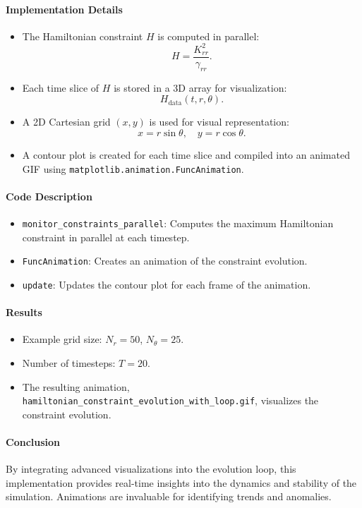 \documentclass[12pt]{article}
\begin{document}
\paragraph{Implementation Details}
\begin{itemize}
    \item The Hamiltonian constraint $H$ is computed in parallel:
    \[
    H = \frac{K_{rr}^2}{\gamma_{rr}}.
    \]
    \item Each time slice of $H$ is stored in a 3D array for visualization:
    \[
    H_{\text{data}}(t, r, \theta).
    \]
    \item A 2D Cartesian grid $(x, y)$ is used for visual representation:
    \[
    x = r \sin\theta, \quad y = r \cos\theta.
    \]
    \item A contour plot is created for each time slice and compiled into an animated GIF using \texttt{matplotlib.animation.FuncAnimation}.
\end{itemize}

\paragraph{Code Description}
\begin{itemize}
    \item \texttt{monitor\_constraints\_parallel}: Computes the maximum Hamiltonian constraint in parallel at each timestep.
    \item \texttt{FuncAnimation}: Creates an animation of the constraint evolution.
    \item \texttt{update}: Updates the contour plot for each frame of the animation.
\end{itemize}

\paragraph{Results}
\begin{itemize}
    \item Example grid size: $N_r = 50$, $N_\theta = 25$.
    \item Number of timesteps: $T = 20$.
    \item The resulting animation, \texttt{hamiltonian\_constraint\_evolution\_with\_loop.gif}, visualizes the constraint evolution.
\end{itemize}

\paragraph{Conclusion}
By integrating advanced visualizations into the evolution loop, this implementation provides real-time insights into the dynamics and stability of the simulation. Animations are invaluable for identifying trends and anomalies.
\end{document}
